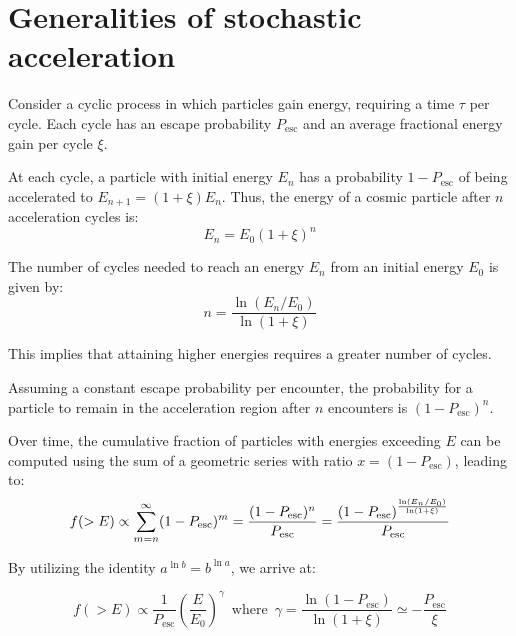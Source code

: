 \section{Generalities of stochastic acceleration}

Consider a cyclic process in which particles gain energy, requiring a time \( \tau \) per cycle. Each cycle has an escape probability \( P_{\text{esc}} \) and an average fractional energy gain per cycle \( \xi \).

At each cycle, a particle with initial energy \( E_n \) has a probability \( 1-P_{\text{esc}} \) of being accelerated to \( E_{n+1} = (1 + \xi) E_n \). Thus, the energy of a cosmic particle after \( n \) acceleration cycles is:
%
\begin{equation}
E_n = E_0 (1 + \xi)^n
\end{equation}

The number of cycles needed to reach an energy \( E_n \) from an initial energy \( E_0 \) is given by:
%
\begin{equation}
n = \frac{\ln \left( E_n/E_0 \right)}{\ln (1 + \xi)}
\end{equation}

This implies that attaining higher energies requires a greater number of cycles.

Assuming a constant escape probability per encounter, the probability for a particle to remain in the acceleration region after \( n \) encounters is \( (1-P_{\text{esc}})^n \).

Over time, the cumulative fraction of particles with energies exceeding \( E \) can be computed using the sum of a geometric series with ratio \( x = (1-P_{\text{esc}}) \), leading to:
%
\begin{equation}
f(>E) 
\propto \sum_{m=n}^\infty (1 - P_{\rm esc})^m
= \frac{(1-P_{\text{esc}})^n}{P_{\text{esc}}} = \frac{(1-P_{\text{esc}})^{\frac{\ln \left( E_n/E_0 \right)}{\ln (1 + \xi)}}}{P_{\text{esc}}} 
\end{equation}

By utilizing the identity \( a^{\ln b} = b^{\ln a} \), we arrive at:
%
\begin{remark}
\begin{equation}\label{Eq:slopegeneralized}
f (>E) \propto \frac{1}{P_{\text{esc}}} \left( \frac{E}{E_0} \right)^{\gamma} \,\,\, \text{where} \,\,\, \gamma = \frac{\ln (1-P_{\text{esc}})}{\ln (1+\xi)} \simeq -\frac{P_{\text{esc}}}{\xi}
\end{equation}
\end{remark}

